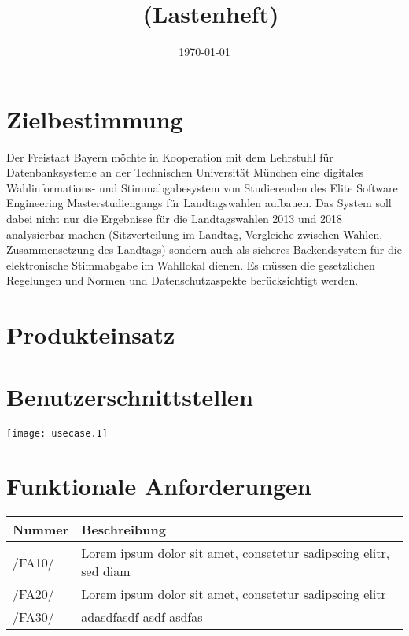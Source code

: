\documentclass[a4paper,12pt]{article}
\title{\projektName~(Lastenheft)}
\author{\authorName}
\date{\today}
\newcommand\addrow[2]{#1 &#2\\ }
\newcommand\addheading[2]{#1 &#2\\ \hline}
\newcommand\tabularhead{\begin{tabular}{lp{13cm}}
\hline
}
\newenvironment{usecase}{\tabularhead}
{\hline\end{tabular}}
\begin{document}
 \setcounter{page}{2}
 \tableofcontents          %
 \clearpage
 
\section{Zielbestimmung}
Der Freistaat Bayern möchte in Kooperation mit dem Lehrstuhl für Datenbanksysteme an der Technischen Universität München
eine digitales Wahlinformations- und Stimmabgabesystem von Studierenden des Elite Software Engineering Masterstudiengangs 
für Landtagswahlen aufbauen.
Das System soll dabei nicht nur die Ergebnisse für die Landtagswahlen 2013 und 2018 analysierbar machen (Sitzverteilung im
Landtag, Vergleiche zwischen Wahlen, Zusammensetzung des Landtags) sondern auch als sicheres Backendsystem für die
elektronische Stimmabgabe im Wahllokal dienen. Es müssen die gesetzlichen Regelungen und Normen und Datenschutzaspekte
berücksichtigt werden.

\section{Produkteinsatz}

\section{Benutzerschnittstellen}
\texttt{[image: usecase.1]}

\section{Funktionale Anforderungen}
\begin{usecase}
  \addheading{Nummer}{Beschreibung} 
  \addrow{/FA10/}{Lorem ipsum dolor sit amet, consetetur sadipscing elitr, sed diam}
  \addrow{/FA20/}{Lorem ipsum dolor sit amet, consetetur sadipscing elitr}
  \addrow{/FA30/}{adasdfasdf asdf asdfas}
\end{usecase}
\end{document}
